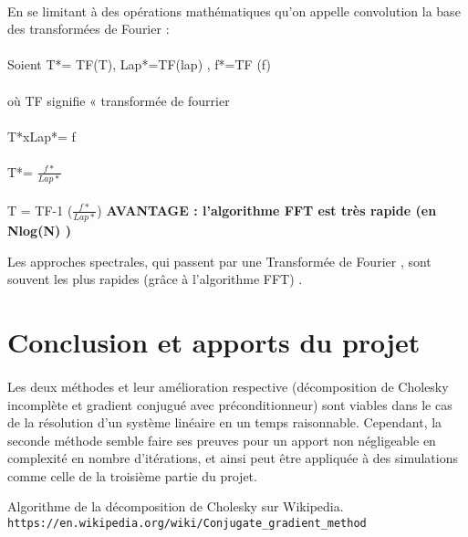 \documentclass{article}
\begin{document}
\begin{enumerate}
  \paragraph{}
  En se limitant à des opérations mathématiques qu'on appelle convolution la base des transformées de Fourier  : 
  \paragraph{}
  Soient T*= TF(T), Lap*=TF(lap) , f*=TF (f) 
  \paragraph{}
  où TF signifie « transformée de fourrier 
  \paragraph{}
  T*xLap*= f
  \paragraph{}
  T*= $\frac{f*}{Lap*}$ 
  \paragraph{}
  T = TF-1 ($\frac{f*}{Lap*}$)  
  \textbf{ AVANTAGE : l’algorithme FFT est très rapide (en Nlog(N) )} 
  
  
  
  
  
  Les approches spectrales, qui passent par une Transformée de Fourier , sont souvent les plus
  rapides (grâce à l’algorithme FFT) . 
  
   
   
   
   
   
   \end{enumerate} 

   
  
   
    

\section*{Conclusion et apports du projet}
\paragraph{}
    Les deux méthodes et leur amélioration respective (décomposition de Cholesky incomplète et gradient conjugué avec préconditionneur) sont viables dans le cas de la résolution d'un système linéaire en un temps raisonnable. Cependant, la seconde méthode semble faire ses preuves pour un apport non négligeable en complexité en nombre d'itérations, et ainsi peut être appliquée à des simulations comme celle de la troisième partie du projet.

\begin{thebibliography}{9}
Algorithme de la décomposition de Cholesky sur Wikipedia.
\\\texttt{https://en.wikipedia.org/wiki/Conjugate\_gradient\_method}
\end{thebibliography}
\end{document}
